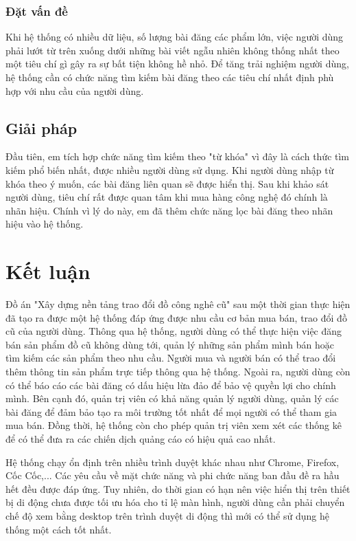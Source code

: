 \documentclass[../DoAn.tex]{subfiles}
\begin{document}
\subsubsection{Đặt vấn đề}
Khi hệ thống có nhiều dữ liệu, số lượng bài đăng các phẩm lớn, việc người dùng phải lướt từ trên xuống dưới những bài viết ngẫu nhiên không thống nhất theo một tiêu chí gì gây ra sự bất tiện không hề nhỏ. Để tăng trải nghiệm người dùng, hệ thống cần có chức năng tìm kiếm bài đăng theo các tiêu chí nhất định phù hợp với nhu cầu của người dùng.
\subsection{Giải pháp}
Đầu tiên, em tích hợp chức năng tìm kiếm theo "từ khóa" vì đây là cách thức tìm kiếm phổ biến nhất, được nhiều người dùng sử dụng. Khi người dùng nhập từ khóa theo ý muốn, các bài đăng liên quan sẽ được hiển thị. Sau khi khảo sát người dùng, tiêu chí rất được quan tâm khi mua hàng công nghệ đó chính là nhãn hiệu. Chính vì lý do này, em đã thêm chức năng lọc bài đăng theo nhãn hiệu vào hệ thống.
\section{Kết luận}
Đồ án "Xây dựng nền tảng trao đổi đồ công nghê cũ" sau một thời gian thực hiện đã tạo ra được một hệ thống đáp ứng được nhu cầu cơ bản mua bán, trao đổi đồ cũ của người dùng. Thông qua hệ thống, người dùng có thể thực hiện việc đăng bán sản phẩm đồ cũ không dùng tới, quản lý những sản phẩm mình bán hoặc tìm kiếm các sản phẩm theo nhu cầu. Người mua và người bán có thể trao đổi thêm thông tin sản phẩm trực tiếp thông qua hệ thống. Ngoài ra, người dùng còn có thể báo cáo các bài đăng có dấu hiệu lừa đảo để bảo vệ quyền lợi cho chính mình. Bên cạnh đó, quản trị viên có khả năng quản lý người dùng, quản lý các bài đăng để đảm bảo tạo ra môi trường tốt nhất để mọi người có thể tham gia mua bán. Đồng thời, hệ thống còn cho phép quản trị viên xem xét các thống kê để có thể đưa ra các chiến dịch quảng cáo có hiệu quả cao nhất.

Hệ thống chạy ổn định trên nhiều trình duyệt khác nhau như Chrome, Firefox, Cốc Cốc,... Các yêu cầu về mặt chức năng và phi chức năng ban đầu đề ra hầu hết đều được đáp ứng. Tuy nhiên, do thời gian có hạn nên việc hiển thị trên thiết bị di động chưa được tối ưu hóa cho tỉ lệ màn hình, người dùng cần phải chuyển chế độ xem bằng desktop trên trình duyệt di động thì mới có thể sử dụng hệ thống một cách tốt nhất.
\end{document}
